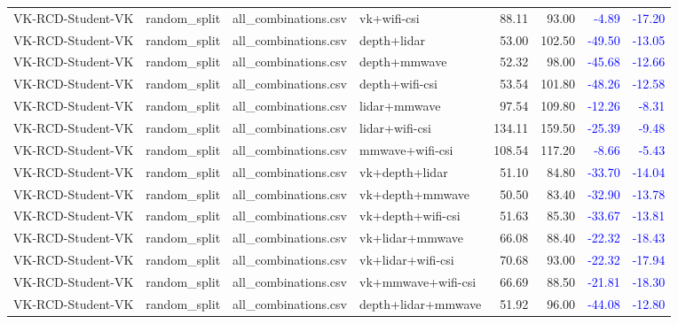 \documentclass[10pt]{article}
\begin{document}
\begin{longtable}{llllrrrr}
VK-RCD-Student-VK & random\_split & all\_combinations.csv & vk+wifi-csi & 88.11 & 93.00 & \textcolor{blue}{-4.89} & \textcolor{blue}{-17.20}\\
VK-RCD-Student-VK & random\_split & all\_combinations.csv & depth+lidar & 53.00 & 102.50 & \textcolor{blue}{-49.50} & \textcolor{blue}{-13.05}\\
VK-RCD-Student-VK & random\_split & all\_combinations.csv & depth+mmwave & 52.32 & 98.00 & \textcolor{blue}{-45.68} & \textcolor{blue}{-12.66}\\
VK-RCD-Student-VK & random\_split & all\_combinations.csv & depth+wifi-csi & 53.54 & 101.80 & \textcolor{blue}{-48.26} & \textcolor{blue}{-12.58}\\
VK-RCD-Student-VK & random\_split & all\_combinations.csv & lidar+mmwave & 97.54 & 109.80 & \textcolor{blue}{-12.26} & \textcolor{blue}{-8.31}\\
VK-RCD-Student-VK & random\_split & all\_combinations.csv & lidar+wifi-csi & 134.11 & 159.50 & \textcolor{blue}{-25.39} & \textcolor{blue}{-9.48}\\
VK-RCD-Student-VK & random\_split & all\_combinations.csv & mmwave+wifi-csi & 108.54 & 117.20 & \textcolor{blue}{-8.66} & \textcolor{blue}{-5.43}\\
VK-RCD-Student-VK & random\_split & all\_combinations.csv & vk+depth+lidar & 51.10 & 84.80 & \textcolor{blue}{-33.70} & \textcolor{blue}{-14.04}\\
VK-RCD-Student-VK & random\_split & all\_combinations.csv & vk+depth+mmwave & 50.50 & 83.40 & \textcolor{blue}{-32.90} & \textcolor{blue}{-13.78}\\
VK-RCD-Student-VK & random\_split & all\_combinations.csv & vk+depth+wifi-csi & 51.63 & 85.30 & \textcolor{blue}{-33.67} & \textcolor{blue}{-13.81}\\
VK-RCD-Student-VK & random\_split & all\_combinations.csv & vk+lidar+mmwave & 66.08 & 88.40 & \textcolor{blue}{-22.32} & \textcolor{blue}{-18.43}\\
VK-RCD-Student-VK & random\_split & all\_combinations.csv & vk+lidar+wifi-csi & 70.68 & 93.00 & \textcolor{blue}{-22.32} & \textcolor{blue}{-17.94}\\
VK-RCD-Student-VK & random\_split & all\_combinations.csv & vk+mmwave+wifi-csi & 66.69 & 88.50 & \textcolor{blue}{-21.81} & \textcolor{blue}{-18.30}\\
VK-RCD-Student-VK & random\_split & all\_combinations.csv & depth+lidar+mmwave & 51.92 & 96.00 & \textcolor{blue}{-44.08} & \textcolor{blue}{-12.80}\\

\end{longtable}
\end{document}
